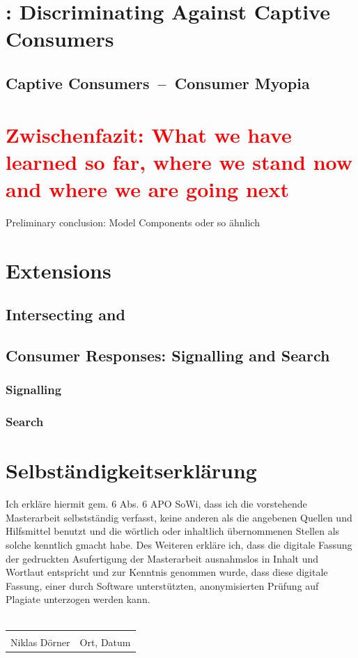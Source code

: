 \documentclass[a4paper, 11 pt, fleqn]{article}
\begin{document}
\section{\citet{Armstrong.2019}: Discriminating Against Captive Consumers}
%
\subsection{Captive Consumers~--~Consumer Myopia}
%
\section{\textcolor{red}{Zwischenfazit: What we have learned so far, where we stand now and where we are going next}}
Preliminary conclusion: Model Components oder so ähnlich
%
\section{Extensions} \label{sec:extensions}
%
\subsection{Intersecting \citet{Choe.2018} and \citet{Armstrong.2019}}
%
\subsection{Consumer Responses: Signalling and Search}
%
\subsubsection{Signalling}
%
\subsubsection{Search}
%
\newpage
{}


\newpage
\section*{Selbständigkeitserklärung}
Ich erkläre hiermit gem. \text{\S}6 Abs. 6 APO SoWi, dass ich die vorstehende Masterarbeit selbstständig verfasst, keine anderen
als die angebenen Quellen und Hilfsmittel benutzt und die wörtlich oder inhaltlich übernommenen Stellen als solche kenntlich
gmacht habe. Des Weiteren erkläre ich, dass die digitale Fassung der gedruckten Asufertigung der Masterarbeit ausnahmslos
in Inhalt und Wortlaut entspricht und zur Kenntnis genommen wurde, dass diese digitale Fassung, einer durch Software
unterstützten, anonymisierten Prüfung auf Plagiate unterzogen werden kann. \\
\vspace*{1 cm}
\\
\noindent\begin{tabular}{ll}
	\makebox[2.5in]{\hrulefill} & \makebox[2.5in]{\hrulefill}\\
	Niklas D\"orner & Ort, Datum\\[8ex]%
\end{tabular}
%
\end{document}
